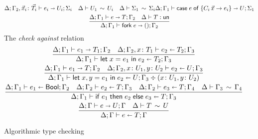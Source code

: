 \begin{figure}[h!]
\begin{gather*}
{    \algtypeout[\kindEnv;\varEnv_2, \vec x_i\colon\vec T_i]{e_i}{U_i}{\Sigma_i}
    \quad
    \typeequiv{U_1}{U_i}    
    \quad
    \ctxequiv{\Sigma_1}{\Sigma_i} 
  }{
    \algtypeout[\kindEnv;\varEnv_1]{\casee{e}{\{C_i\,\vec x\rightarrow e_i\}}}{U}{\Sigma_1}
  }
  \\ %
  \frac{
    \algtypeout[\kindEnv;\varEnv_1]{e}{T}{\varEnv_2}
    \quad
    \isUn T
  }{
    \algtypeout[\kindEnv;\varEnv_1]{\forke{e}}{\unite}{\varEnv_2}
  }
  \end{gather*}
  The \emph{check against} relation\hfill{}
  \begin{gather*}
    \frac{
      \algtypeout[\kindEnv;\varEnv_1]{e_1}{T_1}{\varEnv_2}
      \quad
      \algtypein[\kindEnv;\varEnv_2,x\colon T_1]{e_2}{T_2}{\Gamma_3}
    }{
      \algtypein[\kindEnv;\varEnv_1]{\unlete{x}{e_1}{e_2}}{T_2}{\varEnv_3}
    }
    \\
    \frac{
      \algtypeout[\kindEnv ; \varEnv_1]{e_1}{T}{\varEnv_2}
      \quad
      \algtypein[\kindEnv; \varEnv_2, x\colon U_1, y\colon U_2]{e_2}{U}{\varEnv_3}
    }{
      \algtypein[\kindEnv;
      \varEnv_1]{\binlete{x}{y}{e_1}{e_2}}{U}{\varEnv_3} \div (x\colon U_1, y\colon U_2)
    }
    \\
    \frac{
      \algtypein[\kindEnv;\varEnv_1]{e_1}{\boole}{\varEnv_2}
      \quad
      \algtypein[\kindEnv;\varEnv_2]{e_2}{T}{\varEnv_3}
      \quad
      \algtypein[\kindEnv;\varEnv_2]{e_3}{T}{\varEnv_4}
      \quad
      \ctxequiv{\varEnv_3}{\varEnv_4}
    }{
      \algtypein[\kindEnv;\varEnv_1]{\conditionale{e_1}{e_2}{e_3}}{T}{\varEnv_3}
    }
    \\
        \frac{
      \algtypeout e U \varEnv
      \quad
      \typeequiv T U
    }{
      \algtypein e T \varEnv
    }
  \end{gather*}
  \caption{Algorithmic type checking}
  \label{fig:alg-typing}
\end{figure}

